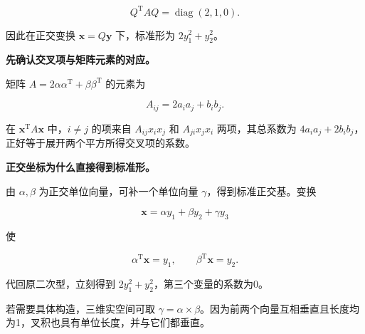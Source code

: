 \documentclass[UTF8,11pt,fontset=windows]{ctexart}
\begin{document}
$$
Q^{\mathrm T}AQ=\operatorname{diag}(2,1,0).
$$

因此在正交变换 $\boldsymbol x=Q\boldsymbol y$ 下，标准形为 $2y_1^2+y_2^2$。

\textbf{先确认交叉项与矩阵元素的对应。}

矩阵 $A=2\alpha\alpha^{\mathrm T}+\beta\beta^{\mathrm T}$ 的元素为

$$
A_{ij}=2a_ia_j+b_ib_j.
$$

在 $\boldsymbol x^{\mathrm T}A\boldsymbol x$ 中，$i\ne j$ 的项来自 $A_{ij}x_ix_j$ 和 $A_{ji}x_jx_i$ 两项，其总系数为 $4a_ia_j+2b_ib_j$，正好等于展开两个平方所得交叉项的系数。

\textbf{正交坐标为什么直接得到标准形。}

由 $\alpha,\beta$ 为正交单位向量，可补一个单位向量 $\gamma$，得到标准正交基。变换

$$
\boldsymbol x=\alpha y_1+\beta y_2+\gamma y_3
$$

使

$$
\alpha^{\mathrm T}\boldsymbol x=y_1,
\qquad \beta^{\mathrm T}\boldsymbol x=y_2.
$$

代回原二次型，立刻得到 $2y_1^2+y_2^2$，第三个变量的系数为0。

若需要具体构造，三维实空间可取 $\gamma=\alpha\times\beta$。因为前两个向量互相垂直且长度均为1，叉积也具有单位长度，并与它们都垂直。
\end{document}
